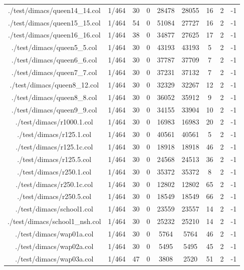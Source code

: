 \begin{table}[htb]
\begin{tabular}{@{}ccccccccc@{}}
        ./test/dimacs/queen14\_14.col & 1/464 & 30 & 0 & 28478 & 28055 & 16 & 2 & -1 \\
        ./test/dimacs/queen15\_15.col & 1/464 & 54 & 0 & 51084 & 27727 & 16 & 2 & -1 \\
        ./test/dimacs/queen16\_16.col & 1/464 & 38 & 0 & 34877 & 27625 & 17 & 2 & -1 \\
        ./test/dimacs/queen5\_5.col & 1/464 & 30 & 0 & 43193 & 43193 & 5 & 2 & -1 \\
        ./test/dimacs/queen6\_6.col & 1/464 & 30 & 0 & 37787 & 37709 & 7 & 2 & -1 \\
        ./test/dimacs/queen7\_7.col & 1/464 & 30 & 0 & 37231 & 37132 & 7 & 2 & -1 \\
        ./test/dimacs/queen8\_12.col & 1/464 & 30 & 0 & 32329 & 32267 & 12 & 2 & -1 \\
        ./test/dimacs/queen8\_8.col & 1/464 & 30 & 0 & 36052 & 35912 & 9 & 2 & -1 \\
        ./test/dimacs/queen9\_9.col & 1/464 & 30 & 0 & 34155 & 33904 & 10 & 2 & -1 \\
        ./test/dimacs/r1000.1.col & 1/464 & 30 & 0 & 16983 & 16983 & 20 & 2 & -1 \\
        ./test/dimacs/r125.1.col & 1/464 & 30 & 0 & 40561 & 40561 & 5 & 2 & -1 \\
        ./test/dimacs/r125.1c.col & 1/464 & 30 & 0 & 18918 & 18918 & 46 & 2 & -1 \\
        ./test/dimacs/r125.5.col & 1/464 & 30 & 0 & 24568 & 24513 & 36 & 2 & -1 \\
        ./test/dimacs/r250.1.col & 1/464 & 30 & 0 & 35372 & 35372 & 8 & 2 & -1 \\
        ./test/dimacs/r250.1c.col & 1/464 & 30 & 0 & 12802 & 12802 & 65 & 2 & -1 \\
        ./test/dimacs/r250.5.col & 1/464 & 30 & 0 & 18549 & 18549 & 66 & 2 & -1 \\
        ./test/dimacs/school1.col & 1/464 & 30 & 0 & 23559 & 23557 & 14 & 2 & -1 \\
        ./test/dimacs/school1\_nsh.col & 1/464 & 30 & 0 & 25232 & 25210 & 14 & 2 & -1 \\
        ./test/dimacs/wap01a.col & 1/464 & 30 & 0 & 5764 & 5764 & 46 & 2 & -1 \\
        ./test/dimacs/wap02a.col & 1/464 & 30 & 0 & 5495 & 5495 & 45 & 2 & -1 \\
        ./test/dimacs/wap03a.col & 1/464 & 47 & 0 & 3808 & 2520 & 51 & 2 & -1 \\

\end{tabular}
\end{table}
